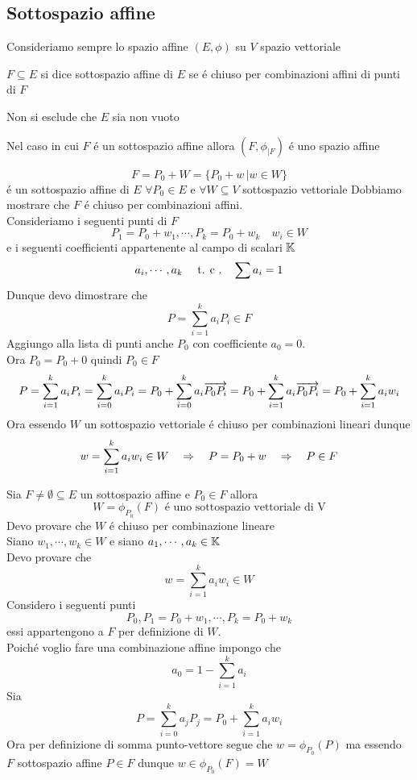 \subsection{Sottospazio affine}
Consideriamo sempre lo spazio affine $(E,\phi)$ su $V$ spazio vettoriale
\begin{defn}\bianco
$F \subseteq E $ si dice sottospazio affine di $E$ se \'e chiuso per combinazioni affini di punti di $F$
\begin{oss}Non si esclude che $E$ sia non vuoto
\end{oss}
\end{defn}
\begin{oss}Nel caso in cui $F$ \'e un sottospazio affine allora
$ ( F, \phi_{\vert F} )$ \'e uno spazio affine
\end{oss}
\spazio
\begin{prop}$$ F=P_0 + W = \{ P_0+w \, \vert w \in W \} $$ \'e un sottospazio affine di $E$ $\forall P_0 \in E $ e $\forall W \subseteq V $ sottospazio vettoriale
\proof Dobbiamo mostrare che $F$ \'e chiuso per combinazioni affini.\\
Consideriamo i seguenti punti di $F$ 
$$ P_1=P_0 + w_1 , \cdots , P_k=P_0 +w_k \quad w_i\in W $$
e i seguenti coefficienti appartenente al campo di scalari $\mathbb{K}$
$$ a_i , \cdots , a_k \quad \text{ t. c .} \quad \sum a_i =1 $$
Dunque devo dimostrare che 
$$ P=\sum_{i=1}^k a_i P_i \in F$$
Aggiungo alla lista di punti anche $P_0$ con coefficiente $a_0=0$.\\
Ora $P_0 = P_0 +0 $ quindi $P_0 \in F$
$$P= \sum_{i=1}^k a_i P_i =  \sum_{i=0}^k a_i P_i=P_0+\sum_{i=0}^k a_i \overrightarrow{P_0 P_i}=P_0 + \sum_{i=1}^k a_i \overrightarrow{P_0P_i}=P_0+\sum_{i=1}^k a_i w_i $$
Ora essendo $W$ un sottospazio vettoriale \'e chiuso per combinazioni lineari dunque
$$ w= \sum_{i=1}^k a_i w_i \in W \quad \Rightarrow\quad  P=P_0+w \quad \Rightarrow \quad P\in F$$
\endproof
\end{prop}
\spazio
\begin{prop} \label{sotto2}Sia $F\neq \emptyset \subseteq E $ un sottospazio affine e   $P_0 \in F $ allora
$$ W = \phi_{P_0}(F) \text{ \'e uno sottospazio vettoriale di V}$$
\proof Devo provare che $W$ \'e chiuso per combinazione lineare \\
Siano $ w_1 , \cdots , w_k \in W $ e siano $a_1, \cdots, a_k \in \mathbb{K}$\\
Devo provare che 
$$ w=\sum_{i=1}^k a_i w_i \in W $$
Considero i seguenti punti
$$P_0,  P_1 = P_0 + w_1 , \cdots , P_k=P_0+w_k $$ 
essi appartengono a $F$ per definizione di $W$.\\
Poich\'e voglio fare una combinazione affine impongo che 
 $$a_0=1-\sum_{i=1}^k a_i$$
Sia 
$$ P=\sum_{i=0}^k a_j P_j = P_0 + \sum_{i=1}^k a_i w_i $$
Ora per definizione di somma punto-vettore segue che $w=\phi_{P_0}(P)$ ma  essendo $F$ sottospazio affine $P\in F$  dunque $w\in \phi_{P_0} (F)=W$
\endproof
\end{prop}

